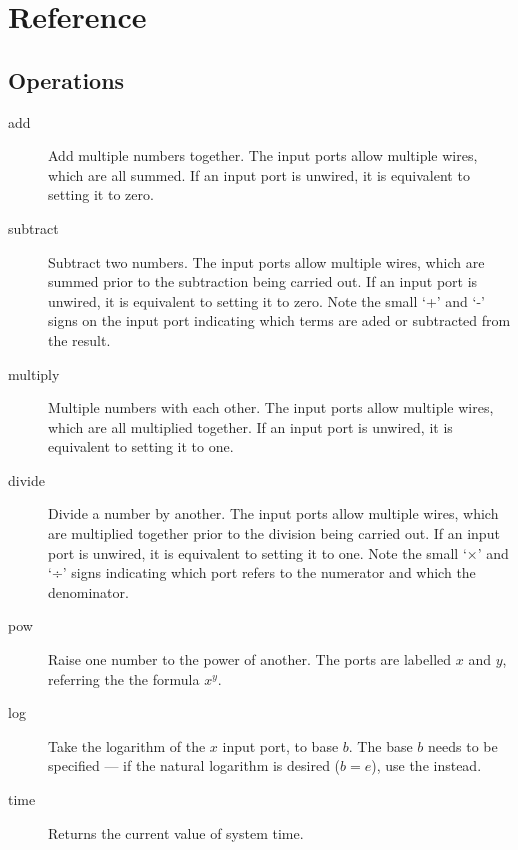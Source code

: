 \chapter{Reference}

\section{Operations}\label{operations}

\begin{description}

\item[add]\label{op:add} Add multiple numbers together. The input ports allow
multiple wires, which are all summed. If an input port is unwired, it
is equivalent to setting it to zero.

\item[subtract]\label{op:subtract} Subtract two numbers. The input ports
allow multiple wires, which are summed prior to the subtraction being
carried out. If an input port is unwired, it is equivalent to setting
it to zero. Note the small `+' and `-' signs on the input port
indicating which terms are aded or subtracted from the result.

\item[multiply]\label{op:multiply} Multiple numbers with each other. The input ports
allow multiple wires, which are all multiplied together. If an input
port is unwired, it is equivalent to setting it to one.

\item[divide]\label{op:divide} Divide a number by another. The input ports allow
multiple wires, which are multiplied together prior to the division
being carried out. If an input port is unwired, it is equivalent to
setting it to one. Note the small `×' and `÷' signs indicating which
port refers to the numerator and which the denominator.

\item[pow]\label{op:pow} Raise one number to the power of another. The
ports are labelled $x$ and $y$, referring the the formula $x^y$.

\item[log]\label{op:log} Take the logarithm of the $x$ input port, to
base $b$. The base $b$ needs to be specified --- if the natural
logarithm is desired ($b=e$), use the  instead.

\item[time]\label{op:time} Returns the current value of system time.


\end{description}

